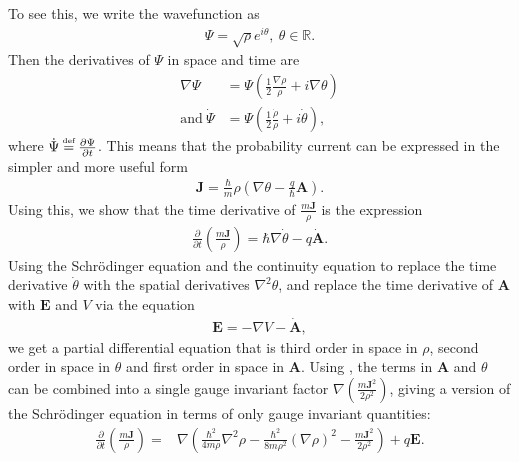 To see this, we write the wavefunction as
\begin{align}
    \Psi = \sqrt{\rho} e^{i \theta}, ~ \theta \in \mathbb{R}.
\end{align}
Then the derivatives of $\Psi$ in space and time are
\begin{align}
    \nabla \Psi &= \Psi \left( \frac{1}{2} \frac{\nabla
        \rho}{\rho} + i \nabla \theta \right) \\
        \mathrm{and}~ \dot \Psi &= \Psi \left( \frac{1}{2} \frac{\dot
        \rho}{\rho} + i \dot \theta \right),
\end{align}
where $\dot \Psi \defeq \dbydt{\Psi}$. This means that the probability current
can be expressed in the simpler and more useful form
\begin{align}
    \mathbf{J} = \frac{\hbar}{m} \rho \left( \nabla \theta - \frac{q}{\hbar}
        \mathbf{A} \right).
    \label{eqn:current}
\end{align}
Using this, we show that the time derivative of $\frac{m \mathbf{J}}{\rho}$ is
the expression
\begin{align}
    \frac{\partial}{\partial t}\left(\frac{m \mathbf{J}}{\rho}\right)
        = \hbar \nabla \dot \theta - q\mathbf{\dot A}.
\end{align}
Using the Schr\"odinger equation and the continuity equation to replace the time
derivative $\dot \theta$ with the spatial derivatives $\nabla^2 \theta$, and
replace the time derivative of $\mathbf{A}$ with $\mathbf{E}$ and $V$ via the
equation
\begin{align}
    \mathbf{E} = - \nabla V - \mathbf{\dot A},
\end{align}
we get a partial differential equation that is third order in space in $\rho$,
second order in space in $\theta$ and first order in space in $\mathbf{A}$.
Using , the terms in $\mathbf{A}$ and $\theta$ can be combined
into a single gauge invariant factor $\nabla \left( \frac{m \mathbf{J}^2}{2
\rho^2} \right)$, giving a version of the Schr\"odinger equation in terms of
only gauge invariant quantities:
\begin{align}
    \frac{\partial}{\partial t} \left( \frac{m \mathbf{J}}{\rho} \right)
    =& \nabla \left( \frac{\hbar^2}{4m\rho} \nabla^2 \rho -
       \frac{\hbar^2}{8m\rho^2} \left(\nabla \rho \right)^2 - \frac{m
       \mathbf{J}^2}{2 \rho^2} \right) + q\mathbf{E}.
    \label{eqn:gise}
\end{align}

